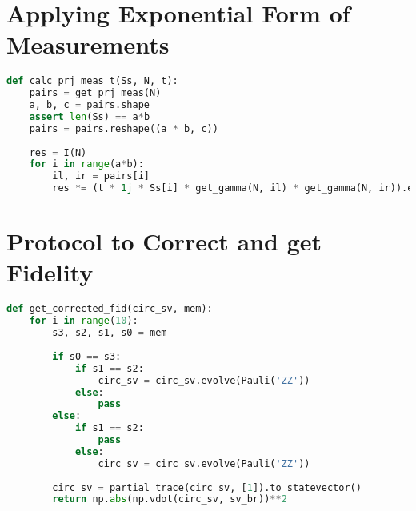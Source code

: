 \documentclass{article}
\begin{document}
\section{Applying Exponential Form of Measurements} %
\label{sec:Applying Exponential Form of Measurements}
\begin{lstlisting}[language=Python]
def calc_prj_meas_t(Ss, N, t):
    pairs = get_prj_meas(N)
    a, b, c = pairs.shape
    assert len(Ss) == a*b
    pairs = pairs.reshape((a * b, c))
    
    res = I(N)    
    for i in range(a*b):
        il, ir = pairs[i]
        res *= (t * 1j * Ss[i] * get_gamma(N, il) * get_gamma(N, ir)).expm()
\end{lstlisting}

\section{Protocol to Correct and get Fidelity} %
\label{sec:Protocol to Correct and get Fidelity}
\begin{lstlisting}[language=Python]
def get_corrected_fid(circ_sv, mem):
    for i in range(10):
        s3, s2, s1, s0 = mem
        
        if s0 == s3:
            if s1 == s2:
                circ_sv = circ_sv.evolve(Pauli('ZZ'))
            else:
                pass
        else:
            if s1 == s2: 
                pass
            else: 
                circ_sv = circ_sv.evolve(Pauli('ZZ'))
                
        circ_sv = partial_trace(circ_sv, [1]).to_statevector()
        return np.abs(np.vdot(circ_sv, sv_br))**2
\end{lstlisting}
\end{document}
